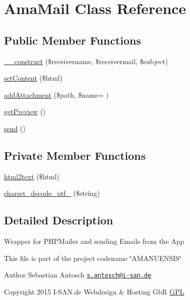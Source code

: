 \hypertarget{a00006}{}\section{Ama\+Mail Class Reference}
\label{a00006}
\subsection*{Public Member Functions}
\begin{DoxyCompactItemize}
\item 
\hyperlink{a00006_ad08be69919daaa811af55b17ebbb8af9}{\+\_\+\+\_\+construct} (\$receivername, \$receivermail, \$subject)
\item 
\hyperlink{a00006_aea60bc046c572df8f2a87a2d388116a1}{set\+Content} (\$html)
\item 
\hyperlink{a00006_afde2b37e8fbc3f69d966f2e3aee1306f}{add\+Attachment} (\$path, \$name= \textquotesingle{}\textquotesingle{})
\item 
\hyperlink{a00006_ab858356a1ff88c3d4efe48f1bf3a9028}{get\+Preview} ()
\item 
\hyperlink{a00006_a12bcef5130168b80d3d52dc82213f19a}{send} ()
\end{DoxyCompactItemize}
\subsection*{Private Member Functions}
\begin{DoxyCompactItemize}
\item 
\hyperlink{a00006_a0a043c52d9e70e64ac1d0d801df3f30a}{html2text} (\$html)
\item 
\hyperlink{a00006_a62c74adc4d0bd5fdf881b127102f1b32}{charset\+\_\+decode\+\_\+utf\+\_} (\$string)
\end{DoxyCompactItemize}


\subsection{Detailed Description}
Wrapper for P\+H\+P\+Mailer and sending Emails from the App

This file is part of the project codename \char`\"{}\+A\+M\+A\+N\+U\+E\+N\+S\+I\+S\char`\"{}

\begin{DoxyAuthor}{Author}
Sebastian Antosch \href{mailto:s.antosch@i-san.de}{\tt s.\+antosch@i-\/san.\+de} 
\end{DoxyAuthor}
\begin{DoxyCopyright}{Copyright}
2015 I-\/\+S\+A\+N.\+de Webdesign \& Hosting Gb\+R \hyperlink{}{G\+P\+L }
\end{DoxyCopyright}


